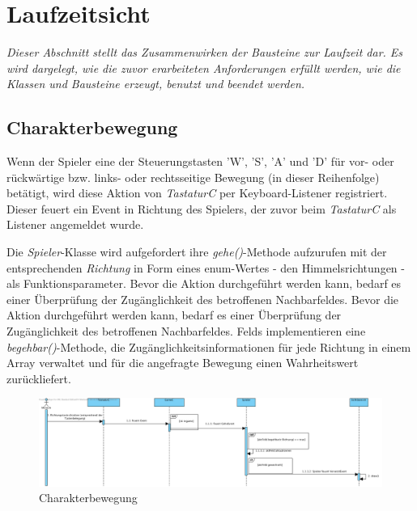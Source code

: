 \chapter{Laufzeitsicht}
\textit{Dieser Abschnitt stellt das Zusammenwirken der Bausteine zur Laufzeit dar.
Es wird dargelegt, wie die zuvor erarbeiteten Anforderungen erfüllt werden, wie die 
Klassen und Bausteine erzeugt, benutzt und beendet werden.}

\section{Charakterbewegung}
Wenn der \gls{Spieler} eine der Steuerungstasten 'W', 'S', 'A' und 'D' für vor- oder rückwärtige bzw.
links- oder rechtsseitige Bewegung (in dieser Reihenfolge) betätigt, wird diese Aktion von 
\textit{TastaturC} per Keyboard-Listener registriert.
Dieser feuert ein Event in Richtung des \gls{Spieler}s, der zuvor beim \textit{TastaturC} als Listener
angemeldet wurde.

Die \textit{Spieler}-Klasse wird aufgefordert ihre \textit{gehe()}-Methode aufzurufen mit der
entsprechenden \textit{Richtung} in Form eines enum-Wertes - den Himmelsrichtungen - als Funktionsparameter.
Bevor die Aktion durchgeführt werden kann, bedarf es einer Überprüfung der Zugänglichkeit des 
betroffenen Nachbarfeldes. 
Bevor die Aktion durchgeführt werden kann, bedarf es einer Überprüfung der Zugänglichkeit des 
betroffenen Nachbarfeldes. \glspl{Feld} implementieren eine \textit{begehbar()}-Methode, die 
Zugänglichkeitsinformationen für jede Richtung in einem Array verwaltet und für die angefragte 
Bewegung einen Wahrheitswert zurückliefert.

\begin{figure}[h]
	\begin{center}
		\includegraphics[trim=0cm 0cm 0cm 0cm, clip=true, width=13cm]{kapitel/laufzeitsicht/Spieler_Steuerung.png}
	\end{center}
	\caption{Charakterbewegung}
	\label{fig:steuerung_uml}
\end{figure}

